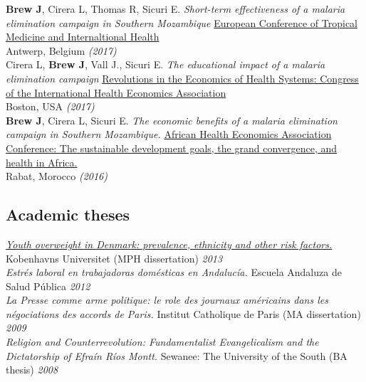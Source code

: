 \documentclass[11pt]{article}
\begin{document}
\noindent \textbf{Brew J}, Cirera L, Thomas R, Sicuri E. \emph{Short-term effectiveness of a malaria elimination campaign in Southern Mozambique} \href{http://www.ectmih2017.be/}{European Conference of Tropical Medicine and Internaltional Health} \\
Antwerp, Belgium \hfill \emph{(2017)}\\

\noindent Cirera L, \textbf{Brew J}, Vall J., Sicuri E. \emph{The educational impact of a malaria elimination campaign} \href{https://www.healtheconomics.org/page/BostonCongress2017}{Revolutions in the Economics of Health Systems: Congress of the International Health Economics Association} \\
Boston, USA \hfill \emph{(2017)}\\


\noindent \textbf{Brew J}, Cirera L, Sicuri E. \emph{The economic benefits of a malaria elimination campaign in Southern Mozambique.} \href{http://afhea.org/en/conferences/conference-2016-rabat}{African Health Economics Association Conference: The sustainable development goals, the grand convergence, and health in Africa.} \\
Rabat, Morocco \hfill \emph{(2016)}\\



\subsection*{Academic theses}

\noindent \emph{\href{http://info.skolesundhed.dk/wp-content/uploads/2012/10/Speciale-af-Joseph-Brew.pdf}{Youth overweight in Denmark: prevalence, ethnicity and other risk factors.}} Kobenhavns Universitet (MPH dissertation) \hfill \emph{2013}\\

\noindent \emph{Estrés laboral en trabajadoras domésticas en Andalucía. } Escuela Andaluza de Salud Pública  \hfill \emph{2012}\\

\noindent \emph{La Presse comme arme politique: le role des journaux américains dans les négociations des accords de Paris.} Institut Catholique de Paris (MA dissertation) \hfill \emph{2009}\\

\noindent \emph{Religion and Counterrevolution: Fundamentalist Evangelicalism and the Dictatorship of Efraín Ríos Montt.} Sewanee: The University of the South (BA thesis) \hfill \emph{2008}\\
\end{document}
